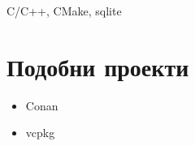 C/C++, CMake, sqlite

\section*{Подобни проекти}
\begin{itemize}
    \item Conan
    \item vcpkg
\end{itemize}
